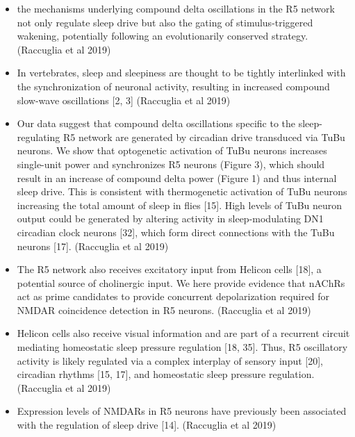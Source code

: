\documentclass[11pt]{article}
\begin{document}
\begin{itemize}
    \item the mechanisms underlying compound delta oscillations in the R5 network not only regulate sleep drive but also the gating of stimulus-triggered wakening, potentially following an evolutionarily conserved strategy.
    \cite{raccugliaNetworkSpecificSynchronizationElectrical2019} (Raccuglia et al 2019)

    \item In vertebrates, sleep and sleepiness are thought to be tightly interlinked with the synchronization of neuronal activity, resulting in increased compound slow-wave oscillations [2, 3]
    \cite{raccugliaNetworkSpecificSynchronizationElectrical2019} (Raccuglia et al 2019)

    \item Our data suggest that compound delta oscillations specific to the sleep-regulating R5 network are generated by circadian drive transduced via TuBu neurons. We show that optogenetic activation of TuBu neurons increases single-unit power and synchronizes R5 neurons (Figure 3), which should result in an increase of compound delta power (Figure 1) and thus internal sleep drive.
    This is consistent with thermogenetic activation of TuBu neurons increasing the total amount of sleep in flies [15]. High levels of TuBu neuron output could be generated by altering activity in sleep-modulating DN1 circadian clock neurons [32], which form direct connections with the TuBu neurons [17].
    \cite{raccugliaNetworkSpecificSynchronizationElectrical2019} (Raccuglia et al 2019)

    \item The R5 network also receives excitatory input from Helicon cells [18], a potential source of cholinergic input. We here provide evidence that nAChRs act as prime candidates to provide concurrent depolarization required for NMDAR coincidence detection in R5 neurons.
    \cite{raccugliaNetworkSpecificSynchronizationElectrical2019} (Raccuglia et al 2019)

    \item Helicon cells also receive visual information and are part of a recurrent circuit mediating homeostatic sleep pressure regulation [18, 35]. Thus, R5 oscillatory activity is likely regulated via a complex interplay of sensory input [20], circadian rhythms [15, 17], and homeostatic sleep pressure regulation.
    \cite{raccugliaNetworkSpecificSynchronizationElectrical2019} (Raccuglia et al 2019)

    \item Expression levels of NMDARs in R5 neurons have previously been associated with the regulation of sleep drive [14].
    \cite{raccugliaNetworkSpecificSynchronizationElectrical2019} (Raccuglia et al 2019)


\end{itemize}
\end{document}
